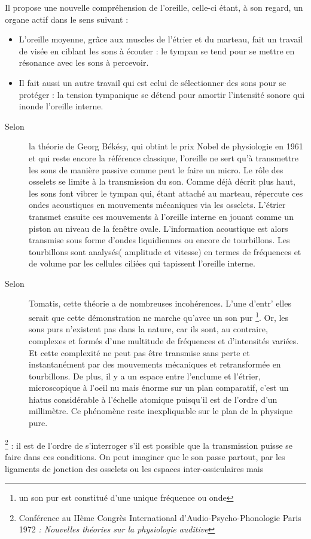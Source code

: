 Il propose une nouvelle compréhension de l'oreille, celle-ci étant,
à son regard, un organe actif dans le sens suivant :
\begin{itemize}
\item L'oreille moyenne, grâce aux muscles de l'étrier et du marteau, fait
un travail de visée en ciblant les sons à écouter : le tympan se tend
pour se mettre en résonance avec les sons à percevoir.
\item Il fait aussi un autre travail qui est celui de sélectionner des sons
pour se protéger : la tension tympanique se détend pour amortir l'intensité
sonore qui inonde l'oreille interne. 
\end{itemize}
\begin{description}
\item [{Selon}] la théorie de Georg Békésy, qui obtint le prix Nobel de
physiologie en 1961 et qui reste encore la référence classique, l'oreille
ne sert qu'à transmettre les sons de manière passive comme peut le
faire un micro. Le rôle des osselets se limite à la transmission du
son. Comme déjà décrit plus haut, les sons font vibrer le tympan qui,
étant attaché au marteau, répercute ces ondes acoustiques en mouvements
mécaniques via les osselets. L'étrier transmet ensuite ces mouvements
à l'oreille interne en jouant comme un piston au niveau de la fenêtre
ovale. L'information acoustique est alors transmise sous forme d'ondes
liquidiennes ou encore de tourbillons. Les tourbillons sont analysés(
amplitude et vitesse) en termes de fréquences et de volume par les
cellules ciliées qui tapissent l'oreille interne. 
\item [{Selon}] Tomatis, cette théorie a de nombreuses incohérences. L'une
d'entr' elles serait que cette démonstration ne marche qu'avec un
son pur \footnote{un son pur est constitué d'une unique fréquence ou onde}.
Or, les sons purs n'existent pas dans la nature, car ils sont, au
contraire, complexes et formés d'une multitude de fréquences et d'intensités
variées. Et cette complexité ne peut pas être transmise sans perte
et instantanément par des mouvements mécaniques et retransformée en
tourbillons. De plus, il y a un espace entre l'enclume et l'étrier,
microscopique à l'oeil nu mais énorme sur un plan comparatif, c'est
un hiatus considérable à l'échelle atomique puisqu'il est de l'ordre
d'un millimètre. Ce phénomène reste inexpliquable sur le plan de la
physique pure.
\end{description}
\footnote{Conférence au IIème Congrès International d'Audio-Psycho-Phonologie
Paris 1972 \emph{: Nouvelles théories sur la physiologie auditive}} : il est de l'ordre de s'interroger s'il est possible que la transmission
puisse se faire dans ces conditions. On peut imaginer que le son passe
partout, par les ligaments de jonction des osselets ou les espaces
inter-ossiculaires mais

